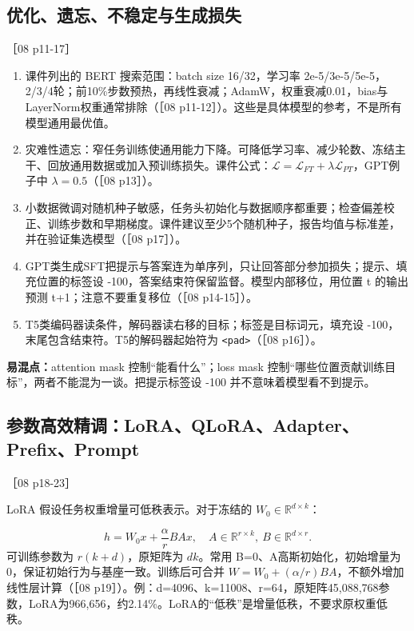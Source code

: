 \documentclass[UTF8,a4paper,zihao=-4,fontset=windows]{ctexart}
\newcommand{\source}[1]{{\small #1}\par}
\begin{document}
\subsection{优化、遗忘、不稳定与生成损失}
\source{［08 p11-17］}
\begin{enumerate}
\item {}课件列出的 BERT 搜索范围：batch size 16/\allowbreak{}32，学习率 2e-5/\allowbreak{}3e-5/\allowbreak{}5e-5，2/\allowbreak{}3/\allowbreak{}4轮；前10\%步数预热，再线性衰减；AdamW，权重衰减0.01，bias与LayerNorm权重通常排除（［08 p11-12］）。这些是具体模型的参考，不是所有模型通用最优值。
\item {}灾难性遗忘：窄任务训练使通用能力下降。可降低学习率、减少轮数、冻结主干、回放通用数据或加入预训练损失。课件公式：$\mathcal L=\mathcal L_{FT}+\lambda\mathcal L_{PT}$，GPT例子中 $\lambda=0.5$（［08 p13］）。
\item {}小数据微调对随机种子敏感，任务头初始化与数据顺序都重要；检查偏差校正、训练步数和早期梯度。课件建议至少5个随机种子，报告均值与标准差，并在验证集选模型（［08 p17］）。
\item {}GPT类生成SFT把提示与答案连为单序列，只让回答部分参加损失；提示、填充位置的标签设 -100，答案结束符保留监督。模型内部移位，用位置 t 的输出预测 t+1；注意不要重复移位（［08 p14-15］）。
\item {}T5类编码器读条件，解码器读右移的目标；标签是目标词元，填充设 -100，末尾包含结束符。T5的解码器起始符为 \texttt{<pad>}（［08 p16］）。
\end{enumerate}
\textbf{易混点：}attention mask 控制“能看什么”；loss mask 控制“哪些位置贡献训练目标”，两者不能混为一谈。把提示标签设 -100 并不意味着模型看不到提示。

\subsection{参数高效精调：LoRA、QLoRA、Adapter、Prefix、Prompt}
\source{［08 p18-23］}
LoRA 假设任务权重增量可低秩表示。对于冻结的 $W_0\in\mathbb R^{d\times k}$：

\[h=W_0x+\frac{\alpha}{r}BAx,\quad A\in\mathbb R^{r\times k},\ B\in\mathbb R^{d\times r}.\]
可训练参数为 $r(k+d)$，原矩阵为 $dk$。常用 B=0、A高斯初始化，初始增量为0，保证初始行为与基座一致。训练后可合并 $W=W_0+(\alpha/r)BA$，不额外增加线性层计算（［08 p19］）。例：d=4096、k=11008、r=64，原矩阵45,088,768参数，LoRA为966,656，约2.14\%。LoRA的“低秩”是增量低秩，不要求原权重低秩。
\end{document}
